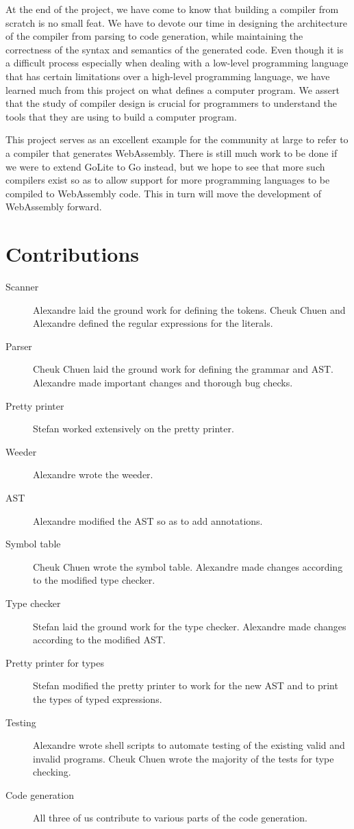 \documentclass{article}
\begin{document}
At the end of the project, we have come to know that building a compiler from scratch is no small feat. We have to devote our time in designing the architecture of the compiler from parsing to code generation, while maintaining the correctness of the syntax and semantics of the generated code. Even though it is a difficult process especially when dealing with a low-level programming language that has certain limitations over a high-level programming language, we have learned much from this project on what defines a computer program. We assert that the study of compiler design is crucial for programmers to understand the tools that they are using to build a computer program.

This project serves as an excellent example for the community at large to refer to a compiler that generates WebAssembly. There is still much work to be done if we were to extend GoLite to Go instead, but we hope to see that more such compilers exist so as to allow support for more programming languages to be compiled to WebAssembly code. This in turn will move the development of WebAssembly forward.

\section{Contributions}
\begin{description}
  \item [Scanner] Alexandre laid the ground work for defining the tokens. Cheuk Chuen and Alexandre defined the regular expressions for the literals.
  \item [Parser] Cheuk Chuen laid the ground work for defining the grammar and AST. Alexandre made important changes and thorough bug checks.
  \item [Pretty printer] Stefan worked extensively on the pretty printer.
  \item [Weeder] Alexandre wrote the weeder.
  \item [AST] Alexandre modified the AST so as to add annotations.
  \item [Symbol table] Cheuk Chuen wrote the symbol table. Alexandre made changes according to the modified type checker.
  \item [Type checker] Stefan laid the ground work for the type checker. Alexandre made changes according to the modified AST.
  \item [Pretty printer for types] Stefan modified the pretty printer to work for the new AST and to print the types of typed expressions.
  \item [Testing] Alexandre wrote shell scripts to automate testing of the existing valid and invalid programs. Cheuk Chuen wrote the majority of the tests for type checking.
  \item [Code generation] All three of us contribute to various parts of the code generation.
\end{description}
\end{document}
